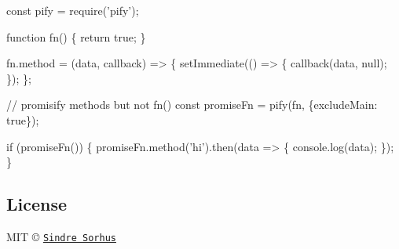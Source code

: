 \begin{DoxyCode}
const pify = require('pify');

function fn() \{
    return true;
\}

fn.method = (data, callback) => \{
    setImmediate(() => \{
        callback(data, null);
    \});
\};

// promisify methods but not fn()
const promiseFn = pify(fn, \{excludeMain: true\});

if (promiseFn()) \{
    promiseFn.method('hi').then(data => \{
        console.log(data);
    \});
\}
\end{DoxyCode}


\subsection*{License}

M\+IT © \href{http://sindresorhus.com}{\tt Sindre Sorhus} 